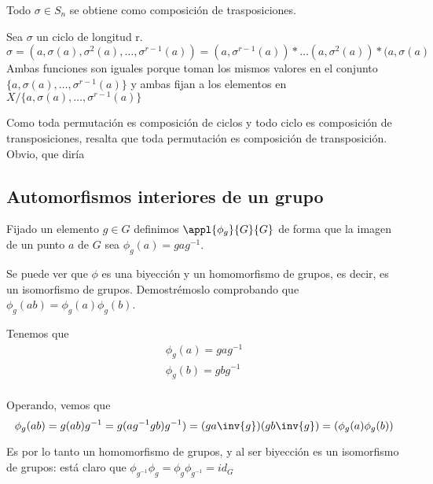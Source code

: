\documentclass[nochap]{apuntes}
\begin{document}
\begin{theorem}
Todo $\sigma \in S_n$ se obtiene como composición de trasposiciones.
\end{theorem}

\begin{example}
Sea $\sigma$ un ciclo de longitud r. \\
$\sigma = ( a, \sigma (a), \sigma ^2(a), \hdots, \sigma ^{r-1}(a)) =
(a, \sigma ^{r-1}(a))\ast \hdots (a, \sigma ^2(a)) \ast(a, \sigma (a) $
\\Ambas funciones son iguales porque toman los mismos valores en el conjunto \\ $\{a, \sigma (a),\hdots , \sigma ^{r-1} (a) \}$ y ambas fijan a los elementos en $X / \{a, \sigma (a),\hdots , \sigma ^{r-1} (a) \}$
\end{example}

\obs Como toda permutación es composición de ciclos y todo ciclo es composición de transposiciones, resalta que toda permutación es composición de transposición. Obvio, que diría \href{http://www.uam.es/personal_pdi/ciencias/dyakubov/dimitry.jpg}{\color{blue}{Dmitry}}


\subsection{Automorfismos interiores de un grupo}

Fijado un elemento $g\in G$ definimos $\appl{\phi _g}{G}{G}$ de forma que la imagen
de un punto $a$ de $G$ sea $\phi _g(a) = gag^{-1}$.

Se puede ver que $\phi$ es una biyección y un homomorfismo de grupos, es decir, es un isomorfismo de grupos. Demostrémoslo comprobando que $\phi_g(ab) = \phi_g(a)\phi_g(b)$.

Tenemos que
\begin{gather*}
\phi _g (a) = g a g^{-1}\\
\phi _g (b) = g b g^{-1}\\
\end{gather*}

Operando, vemos que
\[ \phi _g (a b) = g (a b) g^{-1} = g (a g^{-1} g b) g^{-1}) = (ga\inv{g}) (g b \inv{g}) = (\phi _g (a) \phi _g(b)) \]

Es por lo tanto un homomorfismo de grupos, y al ser biyección es un isomorfismo de grupos: está claro que $\phi _{g^{-1}} \phi _g = \phi _g \phi _{g^{-1}} = id_G$
\end{document}
